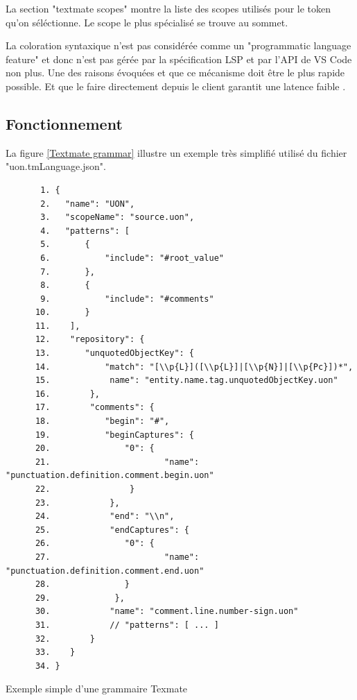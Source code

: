 \documentclass[
    iict, %
    il, %
]{heig-tb}
\begin{document}
La section "textmate scopes" montre la liste des scopes utilisés pour le token qu'on séléctionne. Le scope le plus spécialisé se trouve au sommet.

La coloration syntaxique n'est pas considérée comme un "programmatic language feature" et donc n'est pas gérée par la spécification LSP et par l'API de VS Code non plus.
Une des raisons évoquées et que ce mécanisme doit être le plus rapide possible. Et que le faire directement depuis le client garantit une latence faible
\cite{syntax-highlighting-editor}.

\subsection{Fonctionnement}

La figure \ref{Textmate grammar} illustre un exemple très simplifié utilisé du fichier "uon.tmLanguage.json".

\begin{listing}[!ht]
    \begin{verbatim}
       1. {
       2.   "name": "UON",
       3.   "scopeName": "source.uon",
       4.   "patterns": [
       5.       {
       6.           "include": "#root_value"
       7.       },
       8.       {
       9.           "include": "#comments"
      10.       }
      11.    ],
      12.    "repository": {
      13.       "unquotedObjectKey": {
      14.           "match": "[\\p{L}]([\\p{L}]|[\\p{N}]|[\\p{Pc}])*",
      15.            name": "entity.name.tag.unquotedObjectKey.uon"
      16.        },
      17.        "comments": {
      18.           "begin": "#",
      19.           "beginCaptures": {
      20.               "0": {
      21.                       "name": "punctuation.definition.comment.begin.uon"
      22.                }
      23.            },
      24.            "end": "\\n",
      25.            "endCaptures": {
      26.               "0": {
      27.                       "name": "punctuation.definition.comment.end.uon"
      28.               }
      29.             },
      30.            "name": "comment.line.number-sign.uon"
      31.            // "patterns": [ ... ]
      32.        }
      33.    }
      34. }
    \end{verbatim}
    \caption{Exemple simple d'une grammaire Texmate}
    \label{Textmate grammar}
\end{listing}
\end{document}
